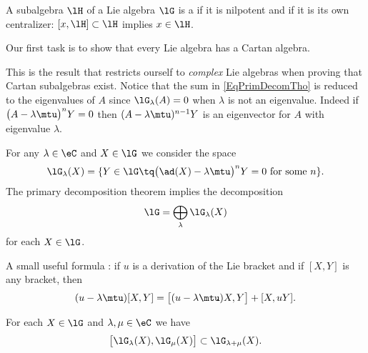 \begin{definition}
A subalgebra $\lH$ of a Lie algebra $\lG$ is a  if it is nilpotent and if it is its own centralizer: $[x,\lH]\subset\lH$ implies $x\in\lH$.
\end{definition}

Our first task is to show that every Lie algebra has a Cartan algebra.

This is the result that restricts ourself to \emph{complex} Lie algebras when proving that Cartan subalgebras exist. Notice that the sum in \eqref{EqPrimDecomTho} is reduced to the eigenvalues of \( A\) since \( \lG_{\lambda}(A)=0\) when \( \lambda\) is not an eigenvalue. Indeed if \( \big( A-\lambda\mtu \big)^nY=0\) then \( (A-\lambda\mtu)^{n-1}Y\) is an eigenvector for \( A\) with eigenvalue \( \lambda\).

For any \( \lambda\in\eC\) and \( X\in\lG\) we consider the space
\begin{equation}
    \lG_{\lambda}(X)=\{ Y\in\lG\tq \big( \ad(X)-\lambda\mtu \big)^nY=0\text{ for some \( n\)} \}.
\end{equation}
The primary decomposition theorem implies the decomposition
\begin{equation}        \label{EqDecomplGpRimDecombijk}
    \lG=\bigoplus_{\lambda}\lG_{\lambda}(X)
\end{equation}
for each \( X\in\lG\). 

A small useful formula : if \( u\) is a derivation of the Lie bracket and if \( [X,Y]\) is any bracket, then
\begin{equation}\label{EqWGujmeF}
    (u-\lambda\mtu)[X,Y]=\big[ (u-\lambda\mtu)X,Y \big]+[X,uY].
\end{equation}

\begin{lemma}   \label{LemVZzSnUW}
    For each \( X\in\lG\) and \( \lambda,\mu\in\eC\) we have
    \begin{equation}
        \big[ \lG_{\lambda}(X),\lG_{\mu}(X) \big]\subset\lG_{\lambda+\mu}(X).
    \end{equation}
\end{lemma}

